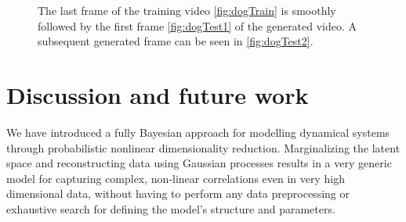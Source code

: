\documentclass{article} %
\begin{document}
\begin{figure}[ht]
\begin{center}
\end{center}
\caption{ \small{
The last frame of the training video \ref{fig:dogTrain} is smoothly followed by the first frame \ref{fig:dogTest1} of the generated video. A subsequent generated frame can be seen in \ref{fig:dogTest2}}.}
\label{fig:dog}
\end{figure}


\section{Discussion and future work}

We have introduced a fully Bayesian approach for modelling dynamical
systems through probabilistic nonlinear dimensionality
reduction. Marginalizing the latent space and reconstructing data
using Gaussian processes results in a very generic model for capturing
complex, non-linear correlations even in very high dimensional data,
without having to perform any data preprocessing or exhaustive search
for defining the model's structure and parameters.


\end{document}
